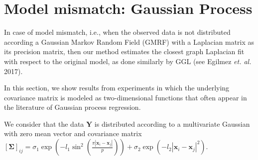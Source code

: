 \section{Model mismatch: Gaussian Process}

In case of model mismatch, i.e., when the observed data is not distributed according
a Gaussian Markov Random Field (GMRF) with a Laplacian matrix as its precision matrix,
then our method estimates the closest graph Laplacian fit with respect to the original
model, as done similarly by GGL (see Egilmez \textit{et. al.} 2017).

In this section, we show results from experiments in which the underlying covariance
matrix is modeled as two-dimensional functions that often appear in the literature of
Gaussian process regression.

We consider that the data $\bm{Y}$ is distributed according to a multivariate Gaussian with
zero mean vector and covariance matrix
$[\boldsymbol{\Sigma}]_{ij} = \sigma_1 \exp{\left(-l_1 \sin^2\left(\frac{\pi|\bm{x}_i - \bm{x}_j|}{p}\right)\right)}
+ \sigma_2 \exp{\left(-l_2|\bm{x}_i - \bm{x}_j|^2\right)}$.

